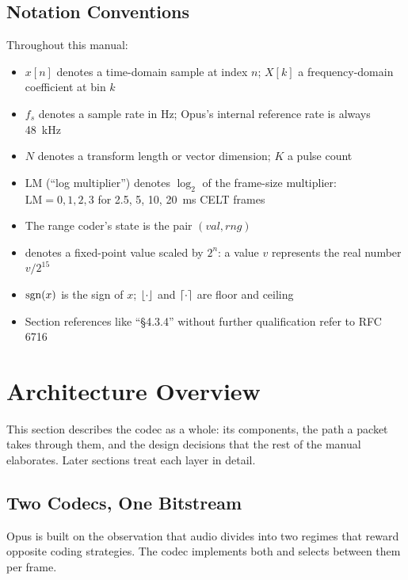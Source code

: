 \subsection{Notation Conventions}\label{subsec:notation}

Throughout this manual:
\begin{itemize}[itemsep=2pt]
  \item $x[n]$ denotes a time-domain sample at index $n$; $X[k]$ a
    frequency-domain coefficient at bin $k$
  \item $f_s$ denotes a sample rate in Hz; Opus's internal reference rate is
    always 48~kHz
  \item $N$ denotes a transform length or vector dimension; $K$ a pulse count
  \item $\mathrm{LM}$ (``log multiplier'') denotes $\log_2$ of the frame-size
    multiplier: $\mathrm{LM}=0,1,2,3$ for 2.5, 5, 10, 20~ms CELT frames
  \item The range coder's state is the pair $(\mathit{val}, \mathit{rng})$
  \item {} denotes a fixed-point value scaled by $2^n$: a 
    value $v$ represents the real number $v / 2^{15}$
  \item $\sgn(x)$ is the sign of $x$; $\floor*{\cdot}$ and $\ceil*{\cdot}$ are
    floor and ceiling
  \item Section references like ``\S4.3.4'' without further qualification refer
    to RFC 6716~\cite{rfc6716}
\end{itemize}

\section{Architecture Overview}\label{sec:architecture}

This section describes the codec as a whole: its components, the path a packet
takes through them, and the design decisions that the rest of the manual
elaborates. Later sections treat each layer in detail.

\subsection{Two Codecs, One Bitstream}\label{subsec:two_codecs}

Opus is built on the observation that audio divides into two regimes that reward
opposite coding strategies. The codec implements both and selects between them
per frame.

